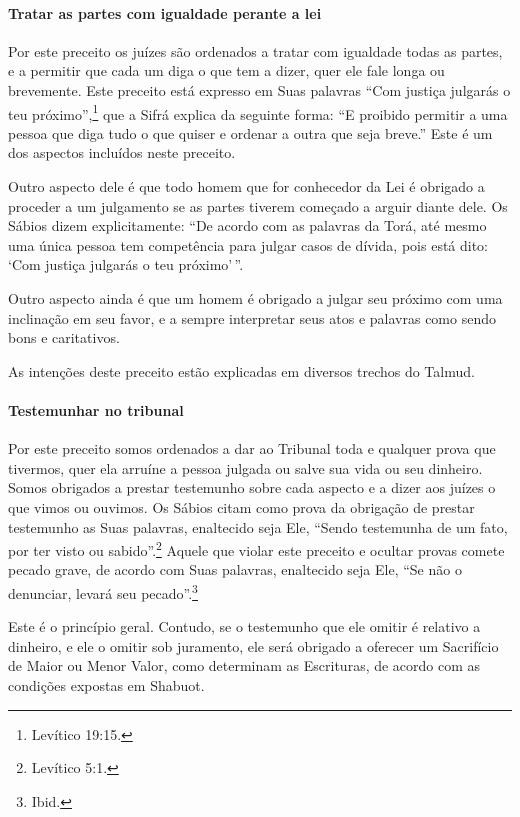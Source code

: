 \paragraph{Tratar as partes com igualdade perante a lei}

Por este preceito os juízes são ordenados a tratar com igualdade todas
as partes, e a permitir que cada um diga o que tem a dizer, quer ele
fale longa ou brevemente. Este preceito está expresso em Suas palavras
``Com justiça julgarás o teu próximo'',\footnote{Levítico 19:15.} que a Sifrá
explica da seguinte forma: ``E proibido permitir a uma pessoa que diga
tudo o que quiser e ordenar a outra que seja breve.'' Este é um dos
aspectos incluídos neste preceito.

Outro aspecto dele é que todo homem que for conhecedor da Lei é obrigado
a proceder a um julgamento se as partes tiverem começado a arguir diante
dele. Os Sábios dizem explicitamente: ``De acordo com as palavras da
Torá, até mesmo uma única pessoa tem competência para julgar casos de
dívida, pois está dito: `Com justiça julgarás o teu próximo'\,''.

Outro aspecto ainda é que um homem é obrigado a julgar seu próximo com
uma inclinação em seu favor, e a sempre interpretar seus atos e
palavras como sendo bons e caritativos.

As intenções deste preceito estão explicadas em diversos trechos do
Talmud.

\paragraph{Testemunhar no tribunal}

Por este preceito somos ordenados a dar ao Tribunal toda e qualquer
prova que tivermos, quer ela arruíne a pessoa julgada ou salve sua vida
ou seu dinheiro. Somos obrigados a prestar testemunho sobre cada aspecto
e a dizer aos juízes o que vimos ou ouvimos. Os Sábios citam como prova
da obrigação de prestar testemunho as Suas palavras, enaltecido seja
Ele, ``Sendo testemunha de um fato, por ter visto ou sabido''.\footnote{Levítico
5:1.} Aquele que violar este preceito e ocultar provas comete pecado
grave, de acordo com Suas palavras, enaltecido seja Ele, ``Se não o
denunciar, levará seu pecado''.\footnote{Ibid.}

Este é o princípio geral. Contudo, se o testemunho que ele omitir é
relativo a dinheiro, e ele o omitir sob juramento, ele será obrigado a
oferecer um Sacrifício de Maior ou Menor Valor, como determinam as
Escrituras, de acordo com as condições expostas em Shabuot.

